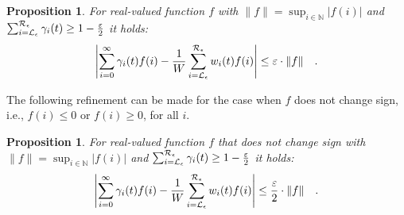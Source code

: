 \documentclass[a4paper,11pt]{article}
\newtheorem{prop}[theorem]{Proposition}
\begin{document}
	\begin{prop}
		\cite{FoxG_ACM88} For real-valued function $f$ with $\|f\| = \sup_{i \in \mathbb{N}}|f(i)|$ and $\sum_{i=\mathcal{L}_{\epsilon}}^{\mathcal{R}_{\epsilon}} \gamma_{i}(t) \geq 1 - \frac{\varepsilon}{2}$ it holds:
		\begin{equation}
			\left| \sum_{i=0}^{\infty} \gamma_{i}(t) f(i) - \frac{1}{W}\sum_{i = \mathcal{L}_{\epsilon}}^{\mathcal{R}_{\epsilon}} w_{i}(t) f(i) \right| \leq \varepsilon \cdot \|f\| \quad . \nonumber
		\end{equation}
	\end{prop}
	The following refinement can be made for the case when $f$ does not change sign, i.e., $f(i) \leq 0$ or $f(i) \geq 0$, for all $i$.
	\begin{prop}
		For real-valued function $f$ that does not change sign with $\|f\| = \sup_{i \in \mathbb{N}}|f(i)|$ and $\sum_{i=\mathcal{L}_{\epsilon}}^{\mathcal{R}_{\epsilon}} \gamma_{i}(t) \geq 1 - \frac{\varepsilon}{2}$ it holds:
		\begin{equation}
			\left| \sum_{i=0}^{\infty} \gamma_{i}(t) f(i) - \frac{1}{W}\sum_{i = \mathcal{L}_{\epsilon}}^{\mathcal{R}_{\epsilon}} w_{i}(t) f(i) \right| \leq \frac{\varepsilon}{2} \cdot \|f\| \quad . \label{eq:fg_imp}
		\end{equation}
			\label{pr:fg_imp}
	\end{prop}
\end{document}

